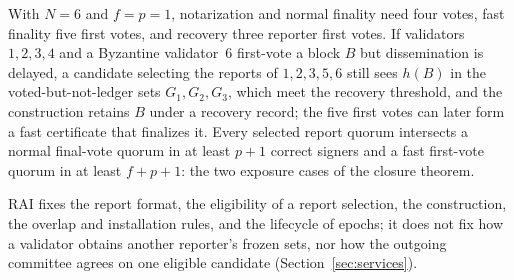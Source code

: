 With $N=6$ and $f=p=1$, notarization and normal finality need four votes, fast finality five first votes, and recovery three reporter first votes. If validators $1,2,3,4$ and a Byzantine validator~6 first-vote a block $B$ but dissemination is delayed, a candidate selecting the reports of $1,2,3,5,6$ still sees $h(B)$ in the voted-but-not-ledger sets $G_1,G_2,G_3$, which meet the recovery threshold, and the construction retains $B$ under a recovery record; the five first votes can later form a fast certificate that finalizes it. Every selected report quorum intersects a normal final-vote quorum in at least $p+1$ correct signers and a fast first-vote quorum in at least $f+p+1$: the two exposure cases of the closure theorem.

RAI fixes the report format, the eligibility of a report selection, the construction, the overlap and installation rules, and the lifecycle of epochs; it does not fix how a validator obtains another reporter's frozen sets, nor how the outgoing committee agrees on one eligible candidate (Section~\ref{sec:services}).

